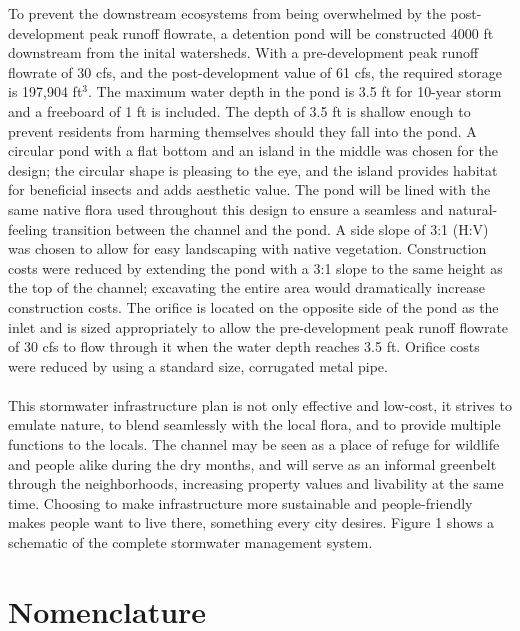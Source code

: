 \documentclass[11pt,letterpaper,final]{report}
\begin{document}
\begin{flushleft}
To prevent the downstream ecosystems from being overwhelmed by the post-development peak runoff flowrate, a detention pond will be constructed 4000 ft downstream from the inital watersheds. With a pre-development peak runoff flowrate of 30 cfs, and the post-development value of 61 cfs, the required storage is 197,904 ft$^3$. The maximum water depth in the pond is 3.5 ft for 10-year storm and a freeboard of 1 ft is included. The depth of 3.5 ft is shallow enough to prevent residents from harming themselves should they fall into the pond. A circular pond with a flat bottom and an island in the middle was chosen for the design; the circular shape is pleasing to the eye, and the island provides habitat for beneficial insects and adds aesthetic value. The pond will be lined with the same native flora used throughout this design to ensure a seamless and natural-feeling transition between the channel and the pond. A side slope of 3:1 (H:V) was chosen to allow for easy landscaping with native vegetation. Construction costs were reduced by extending the pond with a 3:1 slope to the same height as the top of the channel; excavating the entire area would dramatically increase construction costs. The orifice is located on the opposite side of the pond as the inlet and is sized appropriately to allow the pre-development peak runoff flowrate of 30 cfs to flow through it when the water depth reaches 3.5 ft. Orifice costs were reduced by using a standard size, corrugated metal pipe. \\~\\

This stormwater infrastructure plan is not only effective and low-cost, it strives to emulate nature, to blend seamlessly with the local flora, and to provide multiple functions to the locals. The channel may be seen as a place of refuge for wildlife and people alike during the dry months, and will serve as an informal greenbelt through the neighborhoods, increasing property values and livability at the same time. Choosing to make infrastructure more sustainable and people-friendly makes people want to live there, something every city desires. Figure 1 shows a schematic of the complete stormwater management system.


    
    
\newpage
\tableofcontents
\newpage
\listoffigures
{}


\newpage
\chapter*{Nomenclature}


\end{flushleft}
\end{document}
